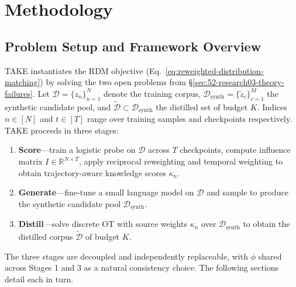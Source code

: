 \section{Methodology} \label{sec:53-research03-method}

\subsection{Problem Setup and Framework Overview} \label{sec:53-research03-method-setup}
\begin{foldable} %
  TAKE instantiates the \ac{RDM} objective (Eq.~\ref{eq:reweighted-distribution-matching}) by solving the two open problems from \S\ref{sec:52-research03-theory-failures}.
  Let $\mathcal{D} = \{z_n\}_{n=1}^{N}$ denote the training corpus, $\mathcal{D}_\text{synth} = \{\tilde{z}_c\}_{c=1}^{M}$ the synthetic candidate pool, and $\tilde{\mathcal{D}} \subset \mathcal{D}_\text{synth}$ the distilled set of budget $K$.
  Indices $n \in [N]$ and $t \in [T]$ range over training samples and checkpoints respectively.
  TAKE proceeds in three stages:
  \begin{enumerate}
    \item \textbf{Score}---train a logistic probe on $\mathcal{D}$ across $T$ checkpoints, compute influence matrix $I \in \mathbb{R}^{N \times T}$, apply reciprocal reweighting and temporal weighting to obtain trajectory-aware knowledge scores $\kappa_n$.
    \item \textbf{Generate}---fine-tune a small language model on $\mathcal{D}$ and sample to produce the synthetic candidate pool $\mathcal{D}_\text{synth}$.
    \item \textbf{Distill}---solve discrete \ac{OT} with source weights $\kappa_n$ over $\mathcal{D}_\text{synth}$ to obtain the distilled corpus $\tilde{\mathcal{D}}$ of budget $K$.
  \end{enumerate}
  The three stages are decoupled and independently replaceable, with $\phi$ shared across Stages 1 and 3 as a natural consistency choice. The following sections detail each in turn.
\end{foldable}

